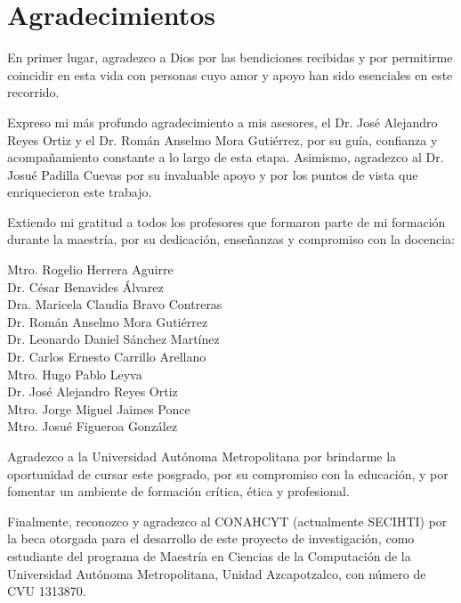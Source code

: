 \chapter*{Agradecimientos}
\begin{center}
    \thispagestyle{empty}
    \vspace*{\fill}

    En primer lugar, agradezco a Dios por las bendiciones recibidas y por permitirme coincidir en esta vida con personas cuyo amor y apoyo han sido esenciales en este recorrido.

    Expreso mi más profundo agradecimiento a mis asesores, el Dr. José Alejandro Reyes Ortiz y el Dr. Román Anselmo Mora Gutiérrez, por su guía, confianza y acompañamiento constante a lo largo de esta etapa. Asimismo, agradezco al Dr. Josué Padilla Cuevas por su invaluable apoyo y por los puntos de vista que enriquecieron este trabajo.

    Extiendo mi gratitud a todos los profesores que formaron parte de mi formación durante la maestría, por su dedicación, enseñanzas y compromiso con la docencia:

    Mtro. Rogelio Herrera Aguirre\\
    Dr. César Benavides Álvarez\\
    Dra. Maricela Claudia Bravo Contreras\\
    Dr. Román Anselmo Mora Gutiérrez\\
    Dr. Leonardo Daniel Sánchez Martínez\\
    Dr. Carlos Ernesto Carrillo Arellano\\
    Mtro. Hugo Pablo Leyva\\
    Dr. José Alejandro Reyes Ortiz\\
    Mtro. Jorge Miguel Jaimes Ponce\\
    Mtro. Josué Figueroa González

    Agradezco a la Universidad Autónoma Metropolitana por brindarme la oportunidad de cursar este posgrado, por su compromiso con la educación, y por fomentar un ambiente de formación crítica, ética y profesional.

    Finalmente, reconozco y agradezco al CONAHCYT (actualmente SECIHTI) por la beca otorgada para el desarrollo de este proyecto de investigación, como estudiante del programa de Maestría en Ciencias de la Computación de la Universidad Autónoma Metropolitana, Unidad Azcapotzalco, con número de CVU 1313870.

    \vspace*{\fill}
\end{center}
